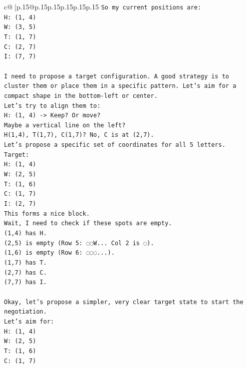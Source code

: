 \documentclass{article}
\begin{document}
{\begin{supertabular}{c@{$\;$}|p{.15\linewidth}@{}p{.15\linewidth}p{.15\linewidth}p{.15\linewidth}p{.15\linewidth}p{.15\linewidth}}
{{{\texttt{So my current positions are:} \\
\texttt{H: (1, 4)} \\
\texttt{W: (3, 5)} \\
\texttt{T: (1, 7)} \\
\texttt{C: (2, 7)} \\
\texttt{I: (7, 7)} \\
\\ 
\texttt{I need to propose a target configuration. A good strategy is to cluster them or place them in a specific pattern. Let's aim for a compact shape in the bottom{-}left or center.} \\
\texttt{Let's try to align them to:} \\
\texttt{H: (1, 4) {-}> Keep? Or move?} \\
\texttt{Maybe a vertical line on the left?} \\
\texttt{H(1,4), T(1,7), C(1,7)? No, C is at (2,7).} \\
\texttt{Let's propose a specific set of coordinates for all 5 letters.} \\
\texttt{Target:} \\
\texttt{H: (1, 4)} \\
\texttt{W: (2, 5)} \\
\texttt{T: (1, 6)} \\
\texttt{C: (1, 7)} \\
\texttt{I: (2, 7)} \\
\texttt{This forms a nice block.} \\
\texttt{Wait, I need to check if these spots are empty.} \\
\texttt{(1,4) has H.} \\
\texttt{(2,5) is empty (Row 5: ◌◌W... Col 2 is ◌).} \\
\texttt{(1,6) is empty (Row 6: ◌◌◌...).} \\
\texttt{(1,7) has T.} \\
\texttt{(2,7) has C.} \\
\texttt{(7,7) has I.} \\
\\ 
\texttt{Okay, let's propose a simpler, very clear target state to start the negotiation.} \\
\texttt{Let's aim for:} \\
\texttt{H: (1, 4)} \\
\texttt{W: (2, 5)} \\
\texttt{T: (1, 6)} \\
\texttt{C: (1, 7)} \\
}}}
\end{supertabular}}
\end{document}
